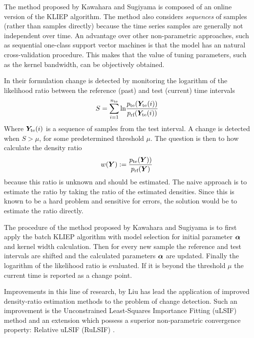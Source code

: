 The method proposed by Kawahara and Sugiyama \cite{kawahara2009change} is composed of an online version of the KLIEP algorithm.
The method also considers \emph{sequences} of samples (rather than samples directly) because the time series samples are generally not independent over time.
An advantage over other non-parametric approaches, such as sequential one-class support vector machines is that the model has an natural cross-validation procedure.
This makes that the value of tuning parameters, such as the kernel bandwidth, can be objectively obtained.

In their formulation change is detected by monitoring the logarithm of the likelihood ratio between the reference (past) and test (current) time intervals
\begin{equation}
  S = \sum_{i=1}^{n_\text{te}} \text{ln} \frac{p_{\text{te}}(\matrixsym{Y}_\text{te}(i))}{p_\text{rf}(\matrixsym{Y}_\text{te}(i))}
\end{equation}
Where $\matrixsym{Y}_\text{te}(i)$ is a sequence of samples from the test interval.
A change is detected when $S > \mu$, for some predetermined threshold $\mu$.
The question is then to how calculate the density ratio
\begin{equation}
  w(\matrixsym{Y}) := \frac{p_\text{te}(\matrixsym{Y)})}{p_\text{rf}(\matrixsym{Y})}
\end{equation}
because this ratio is unknown and should be estimated.
The naive approach is to estimate the ratio by taking the ratio of the estimated densities.
Since this is known to be a hard problem and sensitive for errors, the solution would be to estimate the ratio directly.

The procedure of the method proposed by Kawahara and Sugiyama \cite{kawahara2009change} is to first apply the batch KLIEP algorithm with model selection for initial parameter $\vectorsym{\alpha}$ and kernel width calculation.
Then for every new sample the reference and test intervals are shifted and the calculated parameters $\vectorsym{\alpha}$ are updated.
Finally the logarithm of the likelihood ratio is evaluated.
If it is beyond the threshold $\mu$ the current time is reported as a change point.

Improvements in this line of research, by Liu \etal \cite{liu2013change} has lead the application of improved density-ratio estimation methods to the problem of change detection.
Such an improvement is the Unconstrained Least-Squares Importance Fitting (uLSIF) method \cite{kanamori2009least} and an extension which possess a superior non-parametric convergence property: Relative uLSIF (RuLSIF) \cite{yamada2013relative}.